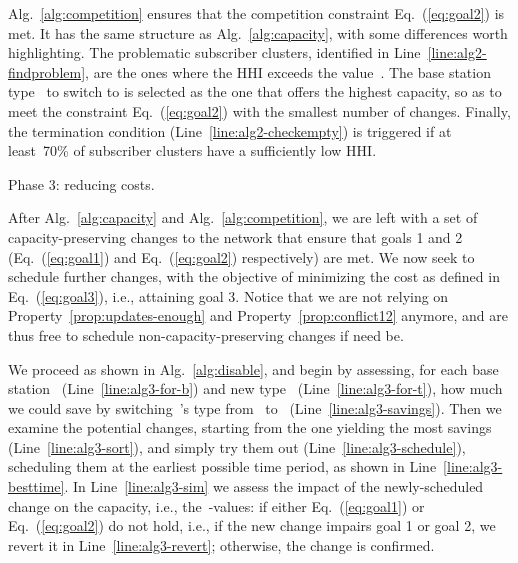 \documentclass[10pt,journal,cspaper,compsoc]{IEEEtran}
\newcommand{\Eq}[1]{Eq.~(\ref{eq:#1})}
\newcommand{\Alg}[1]{Alg.~\ref{alg:#1}}
\newcommand{\Line}[1]{Line~\ref{line:#1}}
\newcommand{\Prop}[1]{Property~\ref{prop:#1}}
\begin{document}
\Alg{competition} ensures that the competition constraint \Eq{goal2} is met. It has
the same structure as \Alg{capacity}, with some differences worth highlighting.
The problematic subscriber clusters, identified in \Line{alg2-findproblem}, are the
ones where the HHI exceeds the value~.
The base station type~ to switch to is selected as the one that offers the highest capacity,
so as to meet the constraint \Eq{goal2} with the smallest number of changes.
Finally, the termination condition (\Line{alg2-checkempty}) is triggered
if at least~70\% of subscriber clusters have a sufficiently low HHI.


\begin{algorithm}[t]
\begin{algorithmic}[1]
\Require 
\ForAll{} \label{line:alg3-for-b}
 \ForAll{} \label{line:alg3-for-t}
  \State{} \label{line:alg3-savings}
 \EndFor
\EndFor
\State{} \label{line:alg3-sort}
\ForAll{}
 \State{} \label{line:alg3-besttime}
 \State{} \label{line:alg3-schedule}
 \State  \label{line:alg3-sim}
 \If{\Eq{goal1}~or~\Eq{goal2} do not hold} \label{line:alg3-check}
  \State{}  \label{line:alg3-revert}
 \EndIf
\EndFor
\Return 
\end{algorithmic}
\caption{Phase 3: reducing costs.
  \label{alg:disable}}
\end{algorithm}

After \Alg{capacity} and \Alg{competition}, we are left with a set of capacity-preserving changes to the network
that ensure that goals 1 and 2 (\Eq{goal1} and \Eq{goal2} respectively) are met.
We now seek to schedule further changes, with the objective of minimizing the cost as defined in \Eq{goal3}, i.e.,
attaining goal 3. Notice that we are not relying on \Prop{updates-enough} and \Prop{conflict12} anymore, and are
thus free to schedule non-capacity-preserving changes if need be.

We proceed as shown in \Alg{disable}, and begin by assessing, for each base station~ (\Line{alg3-for-b}) and new type~
(\Line{alg3-for-t}), how much we could save by switching~'s type from~ to~ (\Line{alg3-savings}). Then we examine
the potential changes, starting from the one yielding the most savings (\Line{alg3-sort}), and simply try them out (\Line{alg3-schedule}),
scheduling them at the earliest possible time period, as shown in \Line{alg3-besttime}. In \Line{alg3-sim} we assess the impact of
the newly-scheduled change on the capacity, i.e., the~-values: if either \Eq{goal1} or \Eq{goal2} do not hold, i.e., if
the new change impairs goal 1 or goal 2, we revert it in \Line{alg3-revert}; otherwise, the change is confirmed.
\end{document}
